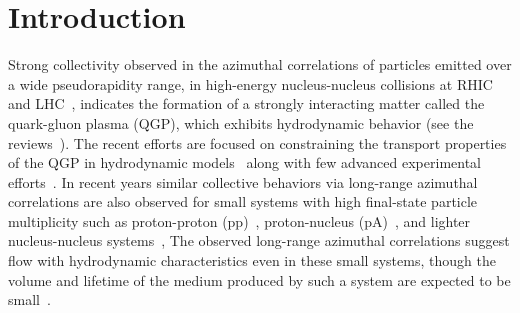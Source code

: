 
\section{Introduction}
\label{sec:intro}

Strong collectivity observed in the azimuthal correlations of particles emitted over a wide pseudorapidity range, in high-energy nucleus-nucleus collisions at RHIC~\cite{Adams:2005dq,Adcox:2004mh,Arsene:2004fa,Back:2004je} and LHC~\cite{Abelev:2012di, Abelev:2014pua, ATLAS:2011ah}, indicates the formation of a strongly interacting matter called the quark-gluon plasma (QGP), which exhibits hydrodynamic behavior (see the reviews~\cite{Romatschke:2007mq,Jeon:2015dfa,Romatschke:2017ejr}). The recent efforts are focused on constraining the transport properties of the QGP in hydrodynamic models~\cite{Niemi:2015qia,Bernhard:2016tnd,Bernhard2019} along with few advanced experimental efforts~\cite{ALICE:2016kpq,Acharya:2017gsw,Acharya:2017zfg,Acharya:2020taj}.
In recent years similar collective behaviors via long-range azimuthal correlations are also observed for small systems with high final-state particle multiplicity such as proton-proton (pp)~\cite{Aad:2015gqa,Khachatryan:2015lva,Khachatryan:2016txc,Acharya:2019vdf}, proton-nucleus (pA)~\cite{Abelev:2012ola,Aad:2014lta,Aaboud:2016yar,Khachatryan:2016ibd}, and lighter nucleus-nucleus systems~\cite{PHENIX:2018lia,Aidala:2017ajz}, %
The observed long-range azimuthal correlations suggest flow with hydrodynamic characteristics even in these small systems, though the volume and lifetime of the medium produced by such a system are expected to be small~\cite{Busza:2018rrf,Nagle:2018nvi}. 

